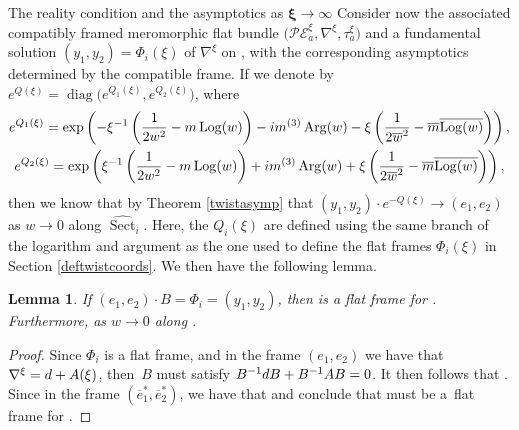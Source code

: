 \documentclass[11pt]{article}
\numberwithin{equation}{section}
\newtheorem{Lemma}[Theorem]{Lemma}
\numberwithin{equation}{section}
\begin{document}
\begin{subsubsection}{The reality condition and the asymptotics as $\boldsymbol{\xi \to \infty}$}
Consider now the associated compatibly framed meromorphic flat bundle $\bigl(\mathcal{PE}_a^{\xi},\nabla^{\xi},\tau_a^{\xi}\bigr)$ and a fundamental solution $(y_1,y_2)=\Phi_i(\xi)$ of $\nabla^{\xi}$ on , with the corresponding asymptotics determined by the compatible frame. If we denote by $e^{Q(\xi)}=\operatorname{diag}\bigl(e^{Q_1(\xi)},e^{Q_2(\xi)}\bigr)$, where
\begin{gather*}
 e^{Q_1(\xi)}=\exp \left(-\xi^{-1}\left(\frac{1}{2w^2}-m\operatorname{Log}(w)\right)-{\rm i}m^{(3)}\operatorname{Arg}(w)
 -\xi\left(\frac{1}{2\overline{w}^2}-\overline{m}\overline{\operatorname{Log}(w)}\right)\right),\\
 e^{Q_2(\xi)}=\exp \left(\xi^{-1}\left(\frac{1}{2w^2}-m\operatorname{Log}(w)\right)+{\rm i}m^{(3)}\operatorname{Arg}(w)
 +\xi\left(\frac{1}{2\overline{w}^2}-\overline{m}\overline{\operatorname{Log}(w)}\right)\right),
\end{gather*}
then we know that by Theorem \ref{twistasymp} that $(y_1,y_2)\cdot e^{-Q(\xi)} \to (e_1,e_2)$ as $w\to 0$ along $\widehat{\operatorname{Sect}}_i$. Here, the $Q_i(\xi)$ are defined using the same branch of the logarithm and argument as the one used to define the flat frames $\Phi_i(\xi)$ in Section \ref{deftwistcoords}. We then have the following lemma.

\begin{Lemma}\label{dual asympotics}
If $(e_1,e_2)\cdot B=\Phi_i=(y_1,y_2)$, then  is a flat frame for . Furthermore,  as $w\to 0$ along .
\end{Lemma}

\begin{proof}
Since $\Phi_i$ is a flat frame, and in the frame $(e_1,e_2)$ we have that $\nabla^{\xi}={\rm d}+A(\xi)$, then~$B$ must satisfy
$
 B^{-1}{\rm d}B+B^{-1}AB=0$.
It then follows that
.
Since in the frame $(\overline{e}_1^*,\overline{e}_2^*)$, we have that  and conclude that  must be a~flat frame for \smash{$\overline{\nabla^{\xi}}^*$}.


\end{proof}
\end{subsubsection}
\end{document}
